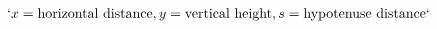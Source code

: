 \documentclass[preview]{standalone}
\begin{document}
\begin{align*}
`x = \text{horizontal distance}, y = \text{vertical height}, s = \text{hypotenuse distance}`
\end{align*}
\end{document}
